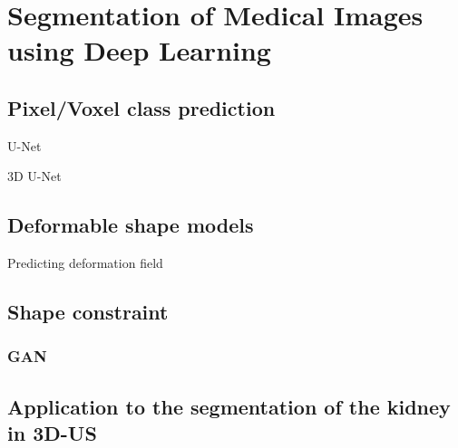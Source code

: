 \chapter{Segmentation of Medical Images using Deep Learning}
\label{chap:seg}

\minitoc

\newpage

\section{Pixel/Voxel class prediction}

U-Net~\textcite{ronneberger2015MICCAI}

3D U-Net~\textcite{cicek2016MICCAI}

\section{Deformable shape models}

Predicting deformation field

\section{Shape constraint}

\subsection{GAN}

\section{Application to the segmentation of the kidney in 3D-US}
